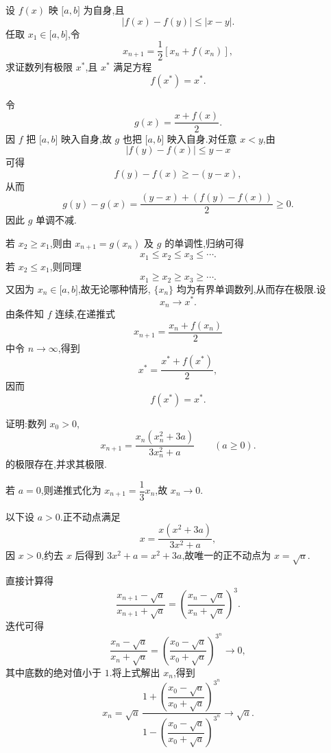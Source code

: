 \begin{example}
  设 $f(x)$ 映 $\lbrack a,b\rbrack$ 为自身,且
  \[
    |f(x)-f(y)|\leq|x-y|.
  \]
  任取 $x_1\in\lbrack a,b\rbrack$,令
  \[
    x_{n+1}=\dfrac{1}{2}[x_n+f(x_n)],
  \]
  求证数列有极限 $x^*$,且 $x^*$ 满足方程
  \[
    f(x^*)=x^*.
  \]
\end{example}
\exampleblank

\begin{solution}

  令
  \[
    g(x)=\dfrac{x+f(x)}{2}.
  \]
  因 $f$ 把 $\lbrack a,b\rbrack$ 映入自身,故 $g$ 也把
  $\lbrack a,b\rbrack$ 映入自身.对任意 $x<y$,由
  \[
    |f(y)-f(x)|\leq y-x
  \]
  可得
  \[
    f(y)-f(x)\geq-(y-x),
  \]
  从而
  \[
    g(y)-g(x)
    =\dfrac{(y-x)+(f(y)-f(x))}{2}\geq0.
  \]
  因此 $g$ 单调不减.
  
  若 $x_2\geq x_1$,则由 $x_{n+1}=g(x_n)$ 及 $g$ 的单调性,归纳可得
  \[
    x_1\leq x_2\leq x_3\leq\cdots.
  \]
  若 $x_2\leq x_1$,则同理
  \[
    x_1\geq x_2\geq x_3\geq\cdots.
  \]
  又因为 $x_n\in\lbrack a,b\rbrack$,故无论哪种情形,
  $\{x_n\}$ 均为有界单调数列,从而存在极限.设
  \[
    x_n\to x^*.
  \]
  由条件知 $f$ 连续,在递推式
  \[
    x_{n+1}=\dfrac{x_n+f(x_n)}{2}
  \]
  中令 $n\to\infty$,得到
  \[
    x^*=\dfrac{x^*+f(x^*)}{2},
  \]
  因而
  \[
    f(x^*)=x^*.
  \]

\end{solution}

\begin{example}
  证明:数列 $x_0>0$,
  \[
    x_{n+1}=\dfrac{x_n(x_n^2+3a)}{3x_n^2+a}\qquad(a\geq0).
  \]
  的极限存在,并求其极限.
\end{example}
\exampleblank

\begin{solution}
  若 $a=0$,则递推式化为 $x_{n+1}=\dfrac{1}{3}x_n$,故 $x_n\to0$.

  以下设 $a>0$.正不动点满足
  \[
    x=\dfrac{x(x^2+3a)}{3x^2+a},
  \]
  因 $x>0$,约去 $x$ 后得到 $3x^2+a=x^2+3a$,故唯一的正不动点为
  $x=\sqrt a$.

  直接计算得
  \[
    \dfrac{x_{n+1}-\sqrt a}{x_{n+1}+\sqrt a}
    =\left(\dfrac{x_n-\sqrt a}{x_n+\sqrt a}\right)^3.
  \]
  迭代可得
  \[
    \dfrac{x_n-\sqrt a}{x_n+\sqrt a}
    =\left(\dfrac{x_0-\sqrt a}{x_0+\sqrt a}\right)^{3^n}
    \longrightarrow0,
  \]
  其中底数的绝对值小于 $1$.将上式解出 $x_n$,得到
  \[
    x_n=\sqrt a\,
    \dfrac{
      1+\left(\dfrac{x_0-\sqrt a}{x_0+\sqrt a}\right)^{3^n}
    }{
      1-\left(\dfrac{x_0-\sqrt a}{x_0+\sqrt a}\right)^{3^n}
    }
    \longrightarrow\sqrt a.
  \]
\end{solution}



